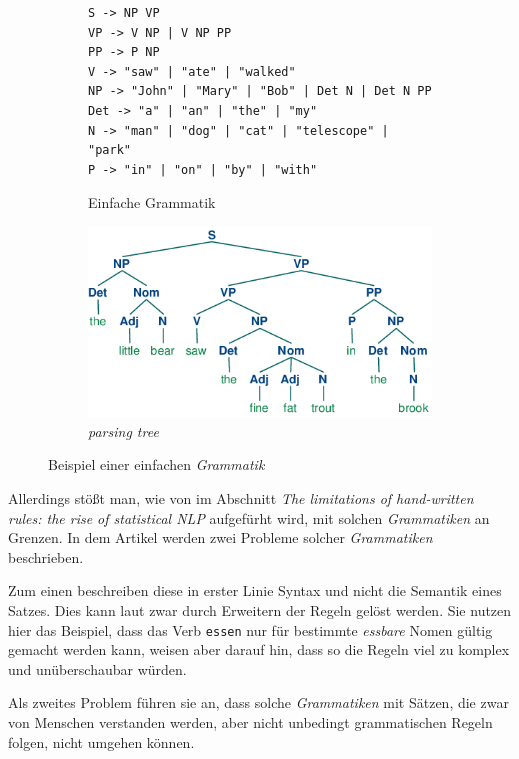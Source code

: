     \begin{figure}[H]
		\centering
        \begin{subfigure}{0.49\textwidth}
			\begin{lstlisting}
S -> NP VP
VP -> V NP | V NP PP
PP -> P NP
V -> "saw" | "ate" | "walked"
NP -> "John" | "Mary" | "Bob" | Det N | Det N PP
Det -> "a" | "an" | "the" | "my"
N -> "man" | "dog" | "cat" | "telescope" | "park"
P -> "in" | "on" | "by" | "with"
    		\end{lstlisting}
            \caption{Einfache Grammatik}
            \label{fig:grammer}
		\end{subfigure}
        \begin{subfigure}{0.49\textwidth}
           	\centering
          	\includegraphics[width=.8\linewidth]{images/grammer.png}
           	\caption{\emph{parsing tree}}
           	\label{fig:parsingTree}
        \end{subfigure}
        \label{fig:grammerWithTree}
        \caption{Beispiel einer einfachen \emph{Grammatik} \parencite[Kapitel 8]{nltk:book}}
        \end{figure}
        \newpage
        
        Allerdings stößt man, wie von \cite[S. 544]{jamia:introduction} im Abschnitt \emph{The limitations of hand-written rules: the rise of statistical NLP} aufgefürht wird, mit solchen \emph{Grammatiken} an Grenzen. In dem Artikel werden zwei Probleme solcher \emph{Grammatiken} beschrieben.
    
    	Zum einen beschreiben diese in erster Linie Syntax und nicht die Semantik eines Satzes. Dies kann laut \cite{jamia:introduction} zwar durch Erweitern der Regeln gelöst werden. Sie nutzen hier das Beispiel, dass das Verb \texttt{essen} nur für bestimmte \emph{essbare} Nomen gültig gemacht werden kann, weisen aber darauf hin, dass so die Regeln viel zu komplex und unüberschaubar würden.
        
        Als zweites Problem führen sie an, dass solche \emph{Grammatiken} mit Sätzen, die zwar von Menschen verstanden werden, aber nicht unbedingt grammatischen Regeln folgen, nicht umgehen können.
        
